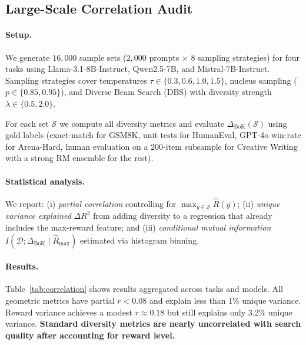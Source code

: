 \documentclass{article}
\newcommand{\cS}{\mathcal{S}}
\newcommand{\Rhat}{\hat{R}}
\newcommand{\DeltaBoK}{\Delta_{\mathrm{BoK}}}
\begin{document}
\subsection{Large-Scale Correlation Audit}
\label{sec:audit}

\paragraph{Setup.}
We generate $16{,}000$ sample sets ($2{,}000$ prompts $\times$ 8 sampling
strategies) for four tasks using Llama-3.1-8B-Instruct, Qwen2.5-7B, and
Mistral-7B-Instruct.  Sampling strategies cover temperatures $\tau \in
\{0.3,0.6,1.0,1.5\}$, nucleus sampling ($p\in\{0.85,0.95\}$), and Diverse Beam
Search (DBS) with diversity strength $\lambda\in\{0.5,2.0\}$.

For each set $\cS$ we compute all diversity metrics and evaluate
$\DeltaBoK(\cS)$ using gold labels (exact-match for GSM8K, unit tests for
HumanEval, GPT-4o win-rate for Arena-Hard, human evaluation on a 200-item
subsample for Creative Writing with a strong RM ensemble for the rest).

\paragraph{Statistical analysis.}
We report: (i) \emph{partial correlation} controlling for $\max_{y\in\cS}\Rhat(y)$;
(ii) \emph{unique variance explained} $\Delta R^2$ from adding diversity to a
regression that already includes the max-reward feature; and (iii)
\emph{conditional mutual information} $I(\mathcal{D};\DeltaBoK \mid \Rhat_{\max})$
estimated via histogram binning.

\paragraph{Results.}
Table~\ref{tab:correlation} shows results aggregated across tasks and models.
All geometric metrics have partial $r < 0.08$ and explain less than 1\% unique
variance.  Reward variance achieves a modest $r \approx 0.18$ but still
explains only 3.2\% unique variance.  \textbf{Standard diversity metrics are
nearly uncorrelated with search quality after accounting for reward level.}
\end{document}
